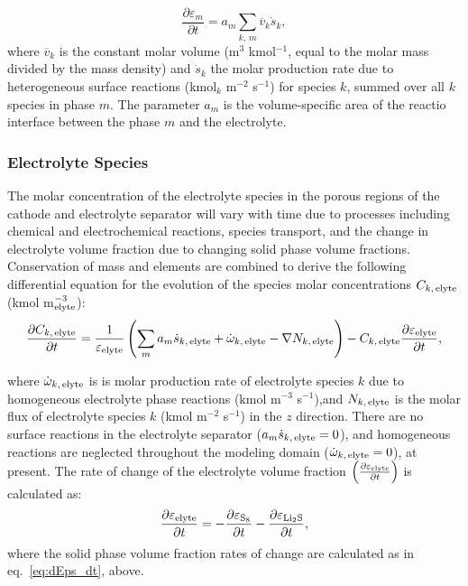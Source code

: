 \documentclass{elsarticle}
\begin{document}
\begin{equation}\label{eq:dEps_dt}
    \frac{\partial \varepsilon_m}{\partial t} = a_m\sum_{k,\,m} \overline{v}_k\dot{s}_k,
\end{equation}
where $\overline{v}_k$ is the constant molar volume (m$^3$ kmol$^{-1}$, equal to the molar mass divided by the mass density) and $\dot{s}_k$ the molar production rate due to heterogeneous surface reactions (kmol$_k$ m$^{-2}$ s$^{-1}$) for species $k$, summed over all $k$ species in phase $m$.  The parameter $a_m$ is the volume-specific area of the reactio interface between the phase $m$ and the electrolyte.

\subsubsection{Electrolyte Species}
The molar concentration of the electrolyte species in the porous regions of the cathode and electrolyte separator will vary with time due to processes including chemical and electrochemical reactions, species transport, and the change in electrolyte volume fraction due to changing solid phase volume fractions. Conservation of mass and elements are combined to derive the following differential equation for the evolution of the species molar concentrations $C_{k,\,{\rm elyte}}$  (kmol m$_{\rm elyte}^{-3}$):
\begin{equation}\label{eq:dCkelyte_dt}
    \frac{\partial C_{k,\,{\rm elyte}}}{\partial t} = \frac{1}{\varepsilon_{\rm elyte}}\left(\sum_m a_m\dot{s}_{k,\,{\rm elyte}} + \dot{\omega}_{k,\,{\rm elyte}} - \nabla N_{k,\,{\rm elyte}}\right) - C_{k,\,{\rm elyte}}\frac{\partial \varepsilon_{\rm elyte}}{\partial t},
\end{equation}

where $\dot{\omega}_{k,\,{\rm elyte}}$ is is molar production rate of electrolyte species $k$ due to homogeneous electrolyte phase reactions (kmol m$^{-3}$ s$^{-1}$),and $N_{k,\,{\rm elyte}}$ is the molar flux of electrolyte species $k$ (kmol m$^{-2}$ s$^{-1}$) in the $z$ direction. There are no surface reactions in the electrolyte separator ($a_m\dot{s}_{k,\,{\rm elyte}} = 0$), and homogeneous reactions are neglected throughout the modeling domain ($\dot{\omega}_{k,\,{\rm elyte}}=0$), at present. The rate of change of the electrolyte volume fraction $\left(\frac{\partial \varepsilon_{\rm elyte}}{\partial t}\right)$ is calculated as:
\begin{equation}\label{eq:dEpsElyte_dt}
    \frac{\partial \varepsilon_{\rm elyte}}{\partial t} = -\frac{\partial \varepsilon_{\rm S_8}}{\partial t} -\frac{\partial \varepsilon_{\rm Li_2S}}{\partial t},
\end{equation}
where the solid phase volume fraction rates of change are calculated as in eq.~\ref{eq:dEps_dt}, above.
\end{document}
